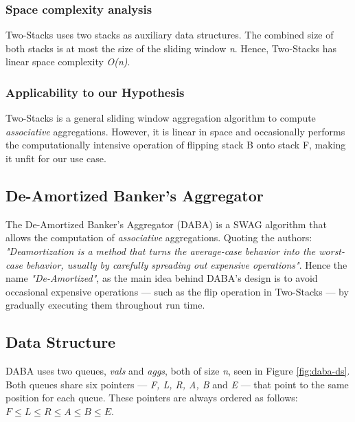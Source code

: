 \subsubsection*{Space complexity analysis}
Two-Stacks uses two stacks as auxiliary data structures. The combined size of both stacks is at most the size of the sliding window \textit{n}. Hence, Two-Stacks has linear space complexity \textit{O(n)}.

\subsubsection*{Applicability to our Hypothesis}
Two-Stacks is a general sliding window aggregation algorithm to compute \textit{associative} aggregations. However, it is linear in space and occasionally performs the computationally intensive operation of flipping stack B onto stack F, making it unfit for our use case.


\subsection{De-Amortized Banker’s Aggregator}

The De-Amortized Banker’s Aggregator (DABA) \cite{Tangwongsan-DABA} is a SWAG algorithm that allows the computation of \textit{associative} aggregations. Quoting the authors: \textit{"Deamortization is a method that turns the average-case behavior into the worst-case behavior, usually by carefully spreading out expensive operations"}. Hence the name \textit{"De-Amortized"}, as the main idea behind DABA's design is to avoid occasional expensive operations --- such as the flip operation in Two-Stacks --- by gradually executing them throughout run time.

\subsection*{Data Structure}

DABA uses two queues, \textit{vals} and \textit{aggs}, both of size \textit{n}, seen in Figure \ref{fig:daba-ds}. Both queues share six pointers --- \textit{F, L, R, A, B} and \textit{E} --- that point to the same position for each queue. These pointers are always ordered as follows: $\textit{F} \leq \textit{L} \leq \textit{R} \leq \textit{A} \leq \textit{B} \leq \textit{E}.$

